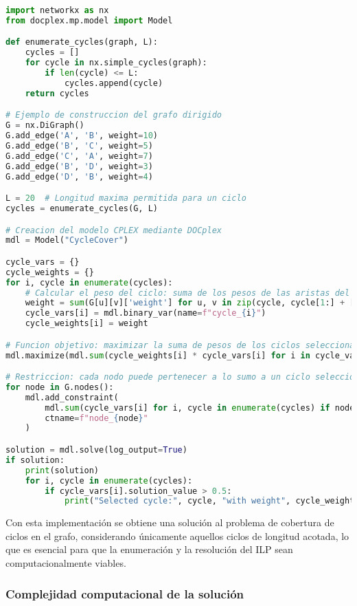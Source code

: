 \documentclass[twocolumn, fontsize=10pt]{article}
\begin{document}
\begin{lstlisting}[language=Python, frame=single, caption={Ejemplo de construcción del grafo dirigido}, breaklines=true]
import networkx as nx
from docplex.mp.model import Model

def enumerate_cycles(graph, L):
    cycles = []
    for cycle in nx.simple_cycles(graph):
        if len(cycle) <= L:
            cycles.append(cycle)
    return cycles

# Ejemplo de construccion del grafo dirigido
G = nx.DiGraph()
G.add_edge('A', 'B', weight=10)
G.add_edge('B', 'C', weight=5)
G.add_edge('C', 'A', weight=7)
G.add_edge('B', 'D', weight=3)
G.add_edge('D', 'B', weight=4)

L = 20  # Longitud maxima permitida para un ciclo
cycles = enumerate_cycles(G, L)

# Creacion del modelo CPLEX mediante DOCplex
mdl = Model("CycleCover")

cycle_vars = {}
cycle_weights = {}
for i, cycle in enumerate(cycles):
    # Calcular el peso del ciclo: suma de los pesos de las aristas del ciclo
    weight = sum(G[u][v]['weight'] for u, v in zip(cycle, cycle[1:] + [cycle[0]]))
    cycle_vars[i] = mdl.binary_var(name=f"cycle_{i}")
    cycle_weights[i] = weight

# Funcion objetivo: maximizar la suma de pesos de los ciclos seleccionados
mdl.maximize(mdl.sum(cycle_weights[i] * cycle_vars[i] for i in cycle_vars))

# Restriccion: cada nodo puede pertenecer a lo sumo a un ciclo seleccionado
for node in G.nodes():
    mdl.add_constraint(
        mdl.sum(cycle_vars[i] for i, cycle in enumerate(cycles) if node in cycle) <= 1,
        ctname=f"node_{node}"
    )

solution = mdl.solve(log_output=True)
if solution:
    print(solution)
    for i, cycle in enumerate(cycles):
        if cycle_vars[i].solution_value > 0.5:
            print("Selected cycle:", cycle, "with weight", cycle_weights[i])
\end{lstlisting}

Con esta implementación se obtiene una solución al problema de cobertura de ciclos en el grafo, considerando únicamente aquellos ciclos de longitud acotada, lo que es esencial para que la enumeración y la resolución del ILP sean computacionalmente viables.

\subsubsection{Complejidad computacional de la solución}
\end{document}
